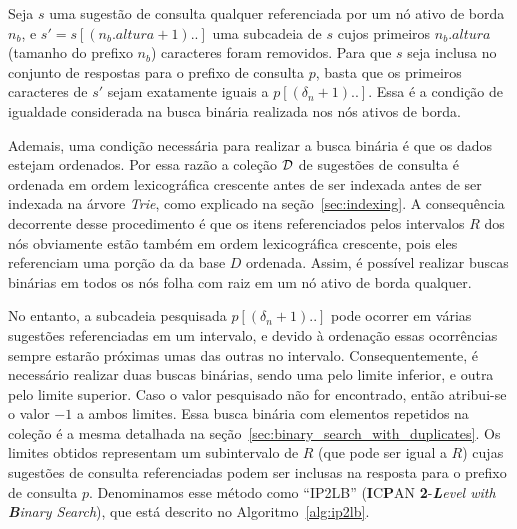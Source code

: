 Seja $s$ uma sugestão de consulta qualquer referenciada por um nó ativo de borda $n_{b}$, e $s' = s[(n_{b}.altura+1)..]$ uma subcadeia de $s$ cujos primeiros $n_{b}.altura$ (tamanho do prefixo $n_{b}$) caracteres foram removidos. Para que $s$ seja inclusa no conjunto de respostas para o prefixo de consulta $p$, basta que os primeiros caracteres de $s'$ sejam exatamente iguais a $p[(\delta_{n} + 1)..]$. Essa é a condição de igualdade considerada na busca binária realizada nos nós ativos de borda.

Ademais, uma condição necessária para realizar a busca binária é que os dados estejam ordenados. Por essa razão a coleção $\mathcal{D}$ de sugestões de consulta é ordenada em ordem lexicográfica crescente antes de ser indexada antes de ser indexada na árvore \textit{Trie}, como explicado na seção~\ref{sec:indexing}. A consequência decorrente desse procedimento é que os itens referenciados pelos intervalos $R$ dos nós obviamente estão também em ordem lexicográfica crescente, pois eles referenciam uma porção da da base $D$ ordenada. Assim, é possível realizar buscas binárias em todos os nós folha com raiz em um nó ativo de borda qualquer. 

No entanto, a subcadeia pesquisada $p[(\delta_{n} + 1)..]$ pode ocorrer em várias sugestões referenciadas em um intervalo, e devido à ordenação essas ocorrências sempre estarão próximas umas das outras no intervalo. Consequentemente, é necessário realizar duas buscas binárias, sendo uma pelo limite inferior, e outra pelo limite superior. Caso o valor pesquisado não for encontrado, então atribui-se o valor $-1$ a ambos limites. Essa busca binária com elementos repetidos na coleção é a mesma detalhada na seção~\ref{sec:binary_search_with_duplicates}. Os limites obtidos representam um subintervalo de $R$ (que pode ser igual a $R$) cujas sugestões de consulta referenciadas podem ser inclusas na resposta para o prefixo de consulta $p$. Denominamos esse método como ``IP2LB'' (\textbf{I}C\textbf{P}AN \textbf{2}-\textit{\textbf{L}evel with \textbf{B}inary Search}), que está descrito no Algoritmo~\ref{alg:ip2lb}.

